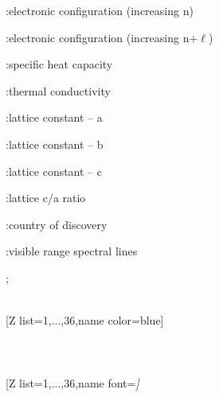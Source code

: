 {{\begin{minipage}{.45\linewidth}
\end{minipage}\begin{minipage}{.55\linewidth}\footnotesize
\begin{itemlist}
\item{}:\hspace{.5ex}electronic configuration (increasing n)
\item{}:\hspace{.5ex}electronic configuration (increasing n+$\ell$)
\item{}:\hspace{.5ex}specific heat capacity
\item{}:\hspace{.5ex}thermal conductivity
\item{}:\hspace{.5ex}lattice constant -- a
\item{}:\hspace{.5ex}lattice constant -- b
\item{}:\hspace{.5ex}lattice constant -- c
\item{}:\hspace{.5ex}lattice c/a ratio
\item{}:\hspace{.5ex}country of discovery
\item{}:\hspace{.5ex}visible range spectral lines
\end{itemlist}
\end{minipage}
};}\vfill%
\\ [5pt][Z list={1,...,36},name color=blue]%
\\ [10pt]\makebox[\linewidth][c]{\scalebox{.6}{\pgfPT[Z list={1,...,36},name color=blue]}}%
\\ [5pt]\pgfPTendoption%
\vfill%
\newpage\ \\ [-32pt]%
\\ [5pt][Z list={1,...,36},name font=\string\tiny\string\itshape]%
